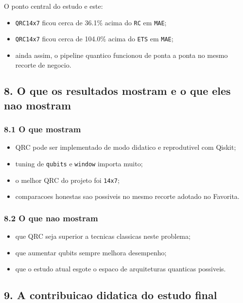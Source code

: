 \documentclass[12pt]{article}
\providecommand{\tightlist}{%
          \setlength{\itemsep}{0pt}\setlength{\parskip}{0pt}}
\begin{document}
O ponto central do estudo e este:

\begin{itemize}
\tightlist
\item
  \texttt{QRC14x7} ficou cerca de 36.1\% acima do \texttt{RC} em \texttt{MAE};
\item
  \texttt{QRC14x7} ficou cerca de 104.0\% acima do \texttt{ETS} em \texttt{MAE};
\item
  ainda assim, o pipeline quantico funcionou de ponta a ponta no mesmo recorte de negocio.
\end{itemize}

\subsection{8. O que os resultados mostram e o que eles nao mostram}\label{8-o-que-os-resultados-mostram-e-o-que-eles-nao-mostram}

\subsubsection{8.1 O que mostram}\label{81-o-que-mostram}

\begin{itemize}
\tightlist
\item
  QRC pode ser implementado de modo didatico e reprodutivel com Qiskit;
\item
  tuning de \texttt{qubits} e \texttt{window} importa muito;
\item
  o melhor QRC do projeto foi \texttt{14x7};
\item
  comparacoes honestas sao possiveis no mesmo recorte adotado no Favorita.
\end{itemize}

\subsubsection{8.2 O que nao mostram}\label{82-o-que-nao-mostram}

\begin{itemize}
\tightlist
\item
  que QRC seja superior a tecnicas classicas neste problema;
\item
  que aumentar qubits sempre melhora desempenho;
\item
  que o estudo atual esgote o espaco de arquiteturas quanticas possiveis.
\end{itemize}

\subsection{9. A contribuicao didatica do estudo final}\label{9-a-contribuicao-didatica-do-estudo-final}
\end{document}
